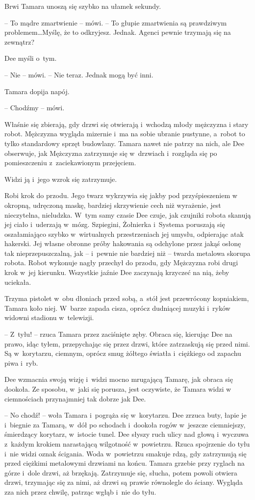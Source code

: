\documentclass[oneside,polish,11pt,sfheadings]{mwbk}
\begin{document}
Brwi Tamara unoszą się szybko na ułamek sekundy. 

-- To mądre zmartwienie
-- mówi. -- To głupie zmartwienia są prawdziwym problemem\ldots Myślę, że to
odkryjesz. Jednak. Agenci pewnie trzymają się na zewnątrz?

Dee myśli o~tym.

-- Nie -- mówi. -- Nie teraz. Jednak mogą być inni.

Tamara dopija napój. 

-- Chodźmy -- mówi.

Właśnie się zbierają, gdy drzwi się otwierają i~wchodzą młody mężczyzna
i stary robot. Mężczyzna wygląda mizernie i~ma na sobie ubranie
pustynne, a~robot to tylko standardowy sprzęt budowlany. Tamara nawet
nie patrzy na nich, ale Dee obserwuje, jak Mężczyzna zatrzymuje się w~drzwiach i~rozgląda się po pomieszczeniu z~zaciekawionym przejęciem.

Widzi ją i~jego wzrok się zatrzymuje.

Robi krok do przodu. Jego twarz wykrzywia się jakby pod przyśpieszeniem
w okropną, udręczoną maskę, bardziej skrzywienie cech niż wyrażenie,
jest nieczytelna, nieludzka. W~tym samy czasie Dee czuje, jak czujniki
robota skanują jej ciało i~uderzają w~mózg. Szpiegini, Żołnierka i~Systema poruszają się oszałamiająco szybko w~wirtualnych przestrzeniach
jej umysłu, odpierając atak hakerski. Jej własne obronne próby hakowania
są odchylone przez jakąś osłonę tak nieprzepuszczalną, jak -- i~pewnie
nie bardziej niż -- twarda metalowa skorupa robota. Robot wykonuje nagły
przechył do przodu, gdy Mężczyzna robi drugi krok w~jej kierunku.
Wszystkie jaźnie Dee zaczynają krzyczeć na nią, żeby uciekała.

Trzyma pistolet w~obu dłoniach przed sobą, a~stół jest przewrócony
kopniakiem, Tamara koło niej. W~barze zapada cisza, oprócz dudniącej
muzyki i~ryków widowni stadionu w~telewizji.

-- Z~tyłu! -- rzuca Tamara przez zaciśnięte zęby. Obraca się, kierując Dee
na prawo, idąc tyłem, przepychając się przez drzwi, które zatrzaskują
się przed nimi. Są w~korytarzu, ciemnym, oprócz smug żółtego światła i~ciężkiego od zapachu piwa i~ryb.

Dee wzmacnia swoją wizję i~widzi mocno mrugającą Tamarę, jak obraca się
dookoła. Ze sposobu, w~jaki się porusza, jest oczywiste, że Tamara widzi
w ciemnościach przynajmniej tak dobrze jak Dee.

-- No chodź! -- woła Tamara i~pogrąża się w~korytarzu. Dee zrzuca buty,
łapie je i~biegnie za Tamarą, w~dół po schodach i~dookoła rogów w~jeszcze ciemniejszy, śmierdzący korytarz, w~istocie tunel. Dee słyszy
ruch ulicy nad głową i~wyczuwa z~każdym krokiem narastającą wilgotność w~powietrzu. Rzuca spojrzenie do tyłu i~nie widzi oznak ścigania. Woda w~powietrzu smakuje rdzą, gdy zatrzymują się przed ciężkimi metalowymi
drzwiami na końcu. Tamara grzebie przy ryglach na górze i~dole drzwi, aż
brzękają. Zatrzymuje się, słucha, potem powoli otwiera drzwi, trzymając
się za nimi, aż drzwi są prawie równolegle do ściany. Wygląda zza nich
przez chwilę, patrząc wgłąb i~nie do tyłu.
\end{document}

